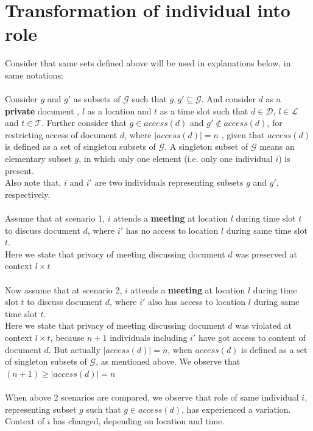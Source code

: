 \section{Transformation of individual into role}
\noindent
Consider that same sets defined above will be used in explanations below, in same notations: \\ \\
\noindent
Consider $g$ and $g'$ as subsets of $\mathcal{G}$ such that $g, g' \subseteq \mathcal{G}$. And consider $d$ as a \textbf{private} document , $l$ as a location and $t$ as a time slot such that $d \in \mathcal{D}$, $l \in \mathcal{L}$ and $t \in \mathcal{T}$.
Further consider that $g \in access(d)$ and $g' \notin access(d)$, for restricting access of document $d$, where $|access(d)| = n$ , given that $access(d)$ is defined as a set of singleton subsets of $\mathcal{G}$. A singleton subset of $\mathcal{G}$ means an elementary subset $g$, in which only one element (i.e. only one individual $i$) is present.\\ 
Also note that, $i$ and $i'$ are two individuals representing subsets $g$ and $g'$, respectively. \\ \\
\noindent
Assume that at scenario 1, $i$ attends a \textbf{meeting} at location $l$ during time slot $t$ to discuss document $d$, where $i'$ has no access to location $l$ during same time slot $t$. \\
Here we state that privacy of meeting discussing document $d$ was preserved at context $l \times t$ \\ \\ 
\noindent
Now assume that at scenario 2, $i$ attends a \textbf{meeting} at location $l$ during time slot $t$ to discuss document $d$, where $i'$ also has access to location $l$ during same time slot $t$. \\
Here we state that privacy of meeting discussing document $d$ was violated at context $l \times t$, because $n + 1$ individuals including $i'$ have got access to content of document $d$. But actually $|access(d)| = n$, when $access(d)$ is defined as a set of singleton subsets of $\mathcal{G}$, as mentioned above. We observe that $(n + 1) \geq |access(d)| = n$ \\ \\ 
\noindent
When above 2 scenarios are compared, we observe that role of same individual $i$, representing subset $g$ such that $g \in access(d)$, has experienced a variation. Context of $i$ has changed, depending on location and time. \\ \\
